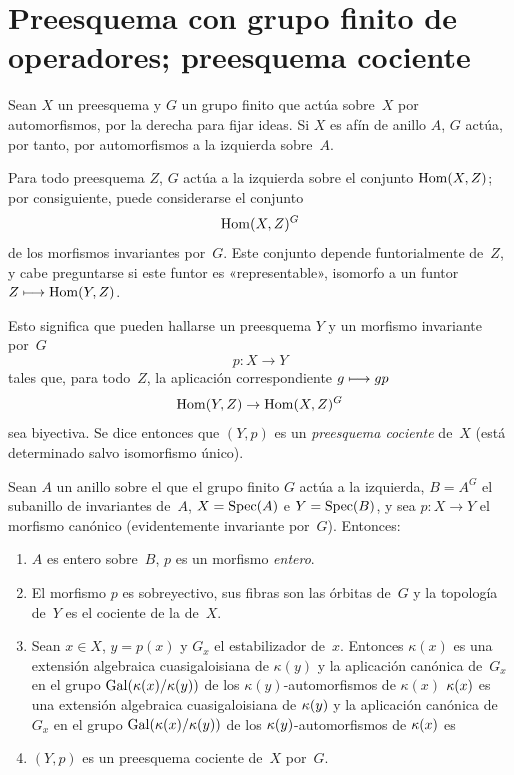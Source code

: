 
\section{Preesquema con grupo finito de operadores; preesquema cociente}
\label{V.1}

Sean $X$ un preesquema y $G$ un grupo finito que actúa sobre~$X$ por
automorfismos, por la derecha para fijar ideas. Si $X$ es afín de anillo $A$,
$G$ actúa, por tanto, por automorfismos a la izquierda sobre~$A$.

Para todo preesquema $Z$, $G$ actúa a la izquierda sobre el conjunto
$\operatorname{Hom}(X,Z)$; por consiguiente, puede considerarse el conjunto
$$
\operatorname{Hom}(X,Z)^G
$$
de los morfismos invariantes por~$G$. Este conjunto depende funtorialmente
de~$Z$, y cabe preguntarse si este funtor es «representable», 
\ie isomorfo a un funtor $Z\longmapsto\operatorname{Hom}(Y,Z)$.

Esto significa que pueden hallarse un preesquema $Y$ y un morfismo invariante
por~$G$
$$
p\colon X\to Y
$$
tales que, para todo~$Z$, la aplicación correspondiente $g\longmapsto gp$
$$
\operatorname{Hom}(Y,Z)\to \operatorname{Hom}(X,Z)^G
$$
sea biyectiva. Se dice entonces que $(Y,p)$ es un
\emph{preesquema cociente}
%
de~$X$ 
(está determinado salvo isomorfismo único).

\begin{proposition}
\label{V.1.1}
Sean $A$ un anillo sobre el que el grupo finito $G$ actúa a la izquierda,
$B=A^G$ el subanillo de invariantes de~$A$, $X=\operatorname{Spec}(A)$ e $Y=\operatorname{Spec}(B)$, y
sea $p\colon X\to Y$ el morfismo canónico (evidentemente invariante
por~$G$). Entonces:
\begin{enumerate}
\item[(i)] $A$ es entero sobre~$B$, \ie $p$ es un morfismo
\emph{entero}.
\item[(ii)] El morfismo $p$ es sobreyectivo, sus fibras son las órbitas
de~$G$ y la topología de~$Y$ es el cociente de la de~$X$.
\item[(iii)] Sean $x\in X$, $y=p(x)$ y $G_x$ el estabilizador de~$x$.
Entonces
{$\kappa(x)$ es una extensión algebraica cuasigaloisiana de $\kappa(y)$ y
la aplicación canónica de~$G_x$ en el grupo
$\operatorname{Gal}(\kappa(x)/\kappa(y))$ de los $\kappa(y)$-automorfismos de
$\kappa(x)$}
{$\kappa(x)$ es una extensión algebraica cuasigaloisiana de $\kappa(y)$ y
la aplicación canónica de~$G_x$ en el grupo
$\operatorname{Gal}(\kappa(x)/\kappa(y))$ de los $\kappa(y)$-automorfismos de
$\kappa(x)$}
es 
\item[(iv)] $(Y,p)$ es un preesquema cociente de~$X$ por~$G$.
\end{enumerate}
\end{proposition}

